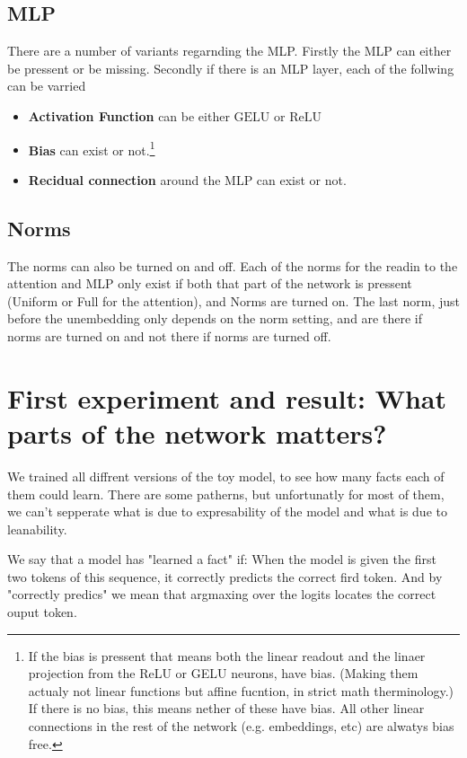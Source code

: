 \documentclass[11pt,a4paper]{article}
\begin{document}
\subsection{MLP}
There are a number of variants regarnding the MLP. Firstly the MLP can either be pressent or be missing. Secondly if there is an MLP layer, each of the follwing can be varried
\begin{itemize}
    \item \textbf{Activation Function} can be either $\mathrm{GELU}$ or $\mathrm{ReLU}$
    \item \textbf{Bias} can exist or not.\footnote{If the bias is pressent that means both the linear readout and the linaer projection from the ReLU or GELU neurons, have bias. (Making them actualy not linear functions but affine fucntion, in strict math therminology.) If there is no bias, this means nether of these have bias. All other linear connections in the rest of the network (e.g. embeddings, etc) are alwatys bias free.}
    \item \textbf{Recidual connection} around the MLP can exist or not.
\end{itemize}

\subsection{Norms}
The norms can also be turned on and off. Each of the norms for the readin to the attention and MLP only exist if both that part of the network is pressent (Uniform or Full for the attention), and Norms are turned on. The last norm, just before the unembedding only depends on the norm setting, and are there if norms are turned on and not there if norms are turned off.

\section{First experiment and result: What parts of the network matters?}

We trained all diffrent versions of the toy model, to see how many facts each of them could learn. There are some patherns, but unfortunatly for most of them, we can't sepperate what is due to expresability of the model and what is due to leanability.

We say that a model has "learned a fact" if: When the model is given the first two tokens of this sequence, it correctly predicts the correct fird token. And by "correctly predics" we mean that argmaxing over the logits locates the correct ouput token.
\end{document}
